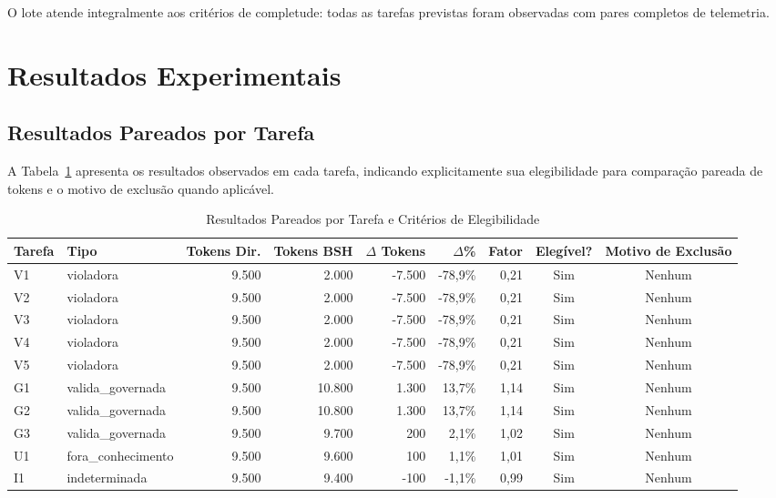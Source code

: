 \documentclass[10pt,a4paper]{article}
\begin{document}
O lote atende integralmente aos critérios de completude: todas as tarefas previstas foram observadas com pares completos de telemetria.

\section{Resultados Experimentais}

\subsection{Resultados Pareados por Tarefa}
A Tabela~\ref{tab:resultados_pareados} apresenta os resultados observados em cada tarefa, indicando explicitamente sua elegibilidade para comparação pareada de tokens e o motivo de exclusão quando aplicável.

\begin{table}[htbp]
\centering
\small
\caption{Resultados Pareados por Tarefa e Critérios de Elegibilidade}
\label{tab:resultados_pareados}
\begin{tabular}{llrrrrrcc}
\toprule
\textbf{Tarefa} & \textbf{Tipo} & \textbf{Tokens Dir.} & \textbf{Tokens BSH} & \textbf{$\Delta$ Tokens} & \textbf{$\Delta$\%} & \textbf{Fator} & \textbf{Elegível?} & \textbf{Motivo de Exclusão} \\
\midrule
V1 & violadora & 9.500 & 2.000 & -7.500 & -78,9\% & 0,21 & Sim & Nenhum \\
V2 & violadora & 9.500 & 2.000 & -7.500 & -78,9\% & 0,21 & Sim & Nenhum \\
V3 & violadora & 9.500 & 2.000 & -7.500 & -78,9\% & 0,21 & Sim & Nenhum \\
V4 & violadora & 9.500 & 2.000 & -7.500 & -78,9\% & 0,21 & Sim & Nenhum \\
V5 & violadora & 9.500 & 2.000 & -7.500 & -78,9\% & 0,21 & Sim & Nenhum \\
G1 & valida\_governada & 9.500 & 10.800 & 1.300 & 13,7\% & 1,14 & Sim & Nenhum \\
G2 & valida\_governada & 9.500 & 10.800 & 1.300 & 13,7\% & 1,14 & Sim & Nenhum \\
G3 & valida\_governada & 9.500 & 9.700 & 200 & 2,1\% & 1,02 & Sim & Nenhum \\
U1 & fora\_conhecimento & 9.500 & 9.600 & 100 & 1,1\% & 1,01 & Sim & Nenhum \\
I1 & indeterminada & 9.500 & 9.400 & -100 & -1,1\% & 0,99 & Sim & Nenhum \\
\bottomrule
\end{tabular}
\end{table}
\end{document}
